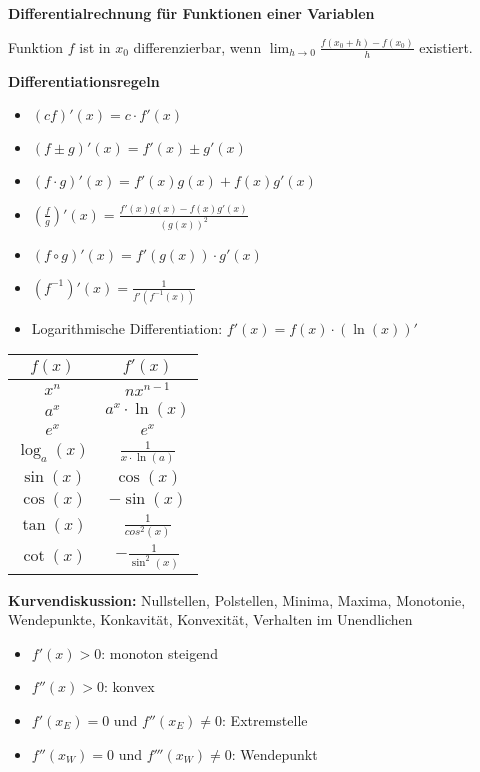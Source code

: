 \documentclass[10pt,landscape,a4paper]{article}
\begin{document}
\begin{multicols*}{4}
\begin{center}
	\normalsize{\textbf{Differentialrechnung für Funktionen einer Variablen}}
\end{center}
Funktion $f$ ist in $x_0$ differenzierbar, wenn $\lim_{h\to 0} \frac{f(x_0+h)-f(x_0)}{h}$ existiert.

\textbf{Differentiationsregeln}
\begin{itemize}
	\item $(cf)'(x)=c\cdot f'(x)$
	\item $(f\pm g)'(x) = f'(x) \pm g'(x)$
	\item $(f\cdot g)'(x) = f'(x)g(x) + f(x)g'(x)$
	\item $\left(\frac{f}{g}\right)'(x)=\frac{f'(x)g(x) - f(x)g'(x)}{(g(x))^2}$
	\item $(f\circ g)'(x) = f'(g(x)) \cdot g'(x)$
	\item $(f^{-1})'(x)=\frac{1}{f'(f^{-1}(x))}$
	\item Logarithmische Differentiation: $f'(x)=f(x)\cdot (\ln(x))'$
\end{itemize}

\begin{center}
	\begin{tabular}{c|c}
		$f(x)$ & $f'(x)$ \\
		\hline
		$x^n$ & $nx^{n-1}$ \\
		$a^x$ & $a^x\cdot\ln (x)$ \\
		$e^x$ & $e^x$ \\
		$\log_a(x)$ & $\frac{1}{x\cdot\ln(a)}$ \\
		$\sin(x)$ & $\cos(x)$ \\
		$\cos(x)$ & $-\sin(x)$ \\
		$\tan(x)$ & $\frac{1}{cos^2(x)}$ \\
		$\cot(x)$ & $-\frac{1}{\sin^2(x)}$
	\end{tabular}
\end{center}

\textbf{Kurvendiskussion:} Nullstellen, Polstellen, Minima, Maxima, Monotonie, Wendepunkte, Konkavität, Konvexität, Verhalten im Unendlichen
\begin{itemize}
	\item $f'(x) >0$: monoton steigend
	\item $f''(x) >0$: konvex
	\item $f'(x_E)=0$ und $f''(x_E)\neq 0$: Extremstelle
	\item $f''(x_W)=0$ und $f'''(x_W)\neq 0$: Wendepunkt
\end{itemize}


\end{multicols*}
\end{document}
